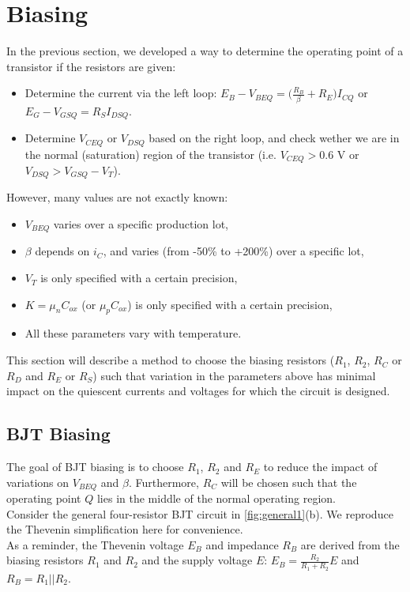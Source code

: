 \section{Biasing}
In the previous section, we developed a way to determine the operating point of a transistor if the resistors are given:
\begin{itemize}
	\item Determine the current via the left loop: $E_B-V_{BEQ} = \bigg( \frac{R_B}{\beta} + R_E \bigg) I_{CQ}$ or $E_G - V_{GSQ} = R_S I_{DSQ}$.
	\item Determine $V_{CEQ}$ or $V_{DSQ}$ based on the right loop, and check wether we are in the normal (saturation) region of the transistor (i.e. $V_{CEQ} > 0.6$ V or $V_{DSQ} > V_{GSQ} - V_T$).
\end{itemize}
However, many values are not exactly known:
\begin{itemize}
	\item $V_{BEQ}$ varies over a specific production lot,
	\item $\beta$ depends on $i_C$, and varies (from -50\% to +200\%) over a specific lot,
	\item $V_T$ is only specified with a certain precision,
	\item $K = \mu_n C_{ox}$ (or $\mu_p C_{ox}$) is only specified with a certain precision,
	\item All these parameters vary with temperature.
\end{itemize}
This section will describe a method to choose the biasing resistors ($R_1$, $R_2$, $R_C$ or $R_D$ and $R_E$ or $R_S$) such that variation in the parameters above has minimal impact on the quiescent currents and voltages for which the circuit is designed.
\subsection{BJT Biasing}
\label{sec:bjt_biasing}
The goal of BJT biasing is to choose $R_1$, $R_2$ and $R_E$ to reduce the impact of variations on $V_{BEQ}$ and $\beta$. Furthermore, $R_C$ will be chosen such that the operating point $Q$ lies in the middle of the normal operating region.\\
Consider the general four-resistor BJT circuit in \ref{fig:general1}(b). We reproduce the Thevenin simplification here for convenience.\\
As a reminder, the Thevenin voltage $E_B$ and impedance $R_B$ are derived from the biasing resistors $R_1$ and $R_2$ and the supply voltage $E$: $E_B = \frac{R_2}{R_1+R_2}E$ and $R_{B} = R_1 || R_2$.


